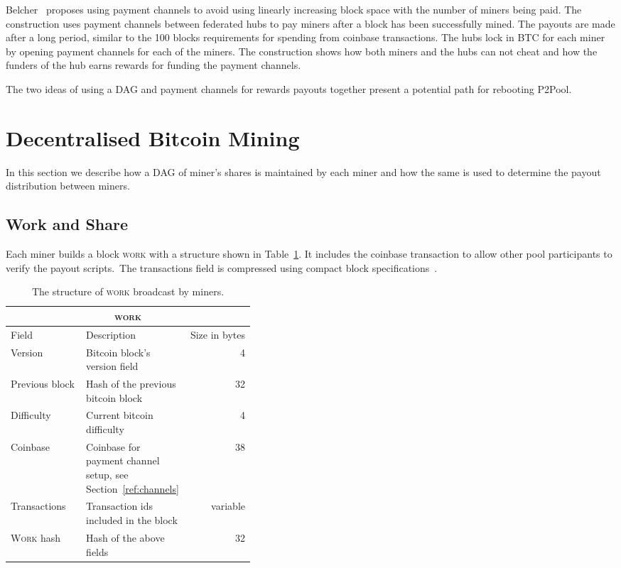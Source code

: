 \documentclass{article}
\begin{document}
Belcher~\cite{channels-for-rewards} proposes using payment channels to
avoid using linearly increasing block space with the number of miners
being paid. The construction uses payment channels between federated
hubs to pay miners after a block has been successfully mined. The
payouts are made after a long period, similar to the 100 blocks
requirements for spending from coinbase transactions. The hubs lock in
BTC for each miner by opening payment channels for each of the
miners. The construction shows how both miners and the hubs can not
cheat and how the funders of the hub earns rewards for funding the
payment channels.

The two ideas of using a DAG and payment channels for rewards
payouts together present a potential path for rebooting P2Pool.

\section{Decentralised Bitcoin Mining}

In this section we describe how a DAG of miner's shares is maintained
by each miner and how the same is used to determine the payout
distribution between miners.

\subsection{Work and Share}

Each miner builds a block \textsc{work} with a structure shown in
Table~\ref{table:work}. It includes the coinbase transaction to allow
other pool participants to verify the payout scripts.\ The
transactions field is compressed using compact block
specifications~\cite{compact-blocks}.

\begin{table}
  \centering
  \begin{tabular}{ lp{0.4\linewidth}r }
    \multicolumn{3}{c}{\textsc{work}} \\
    \hline
    Field & Description & Size in bytes \\
    \hline
    Version & Bitcoin block's version field & 4\\
    Previous block & Hash of the previous bitcoin block & 32 \\
    Difficulty & Current bitcoin difficulty & 4 \\
    Coinbase & Coinbase for payment channel setup, see Section~\ref{ref:channels} & 38 \\
    Transactions & Transaction ids included in the block & variable \\
    \textsc{Work} hash & Hash of the above fields & 32 \\
    \hline
  \end{tabular}
  \caption{The structure of \textsc{work} broadcast by
    miners.}\label{table:work}
\end{table}
\end{document}
